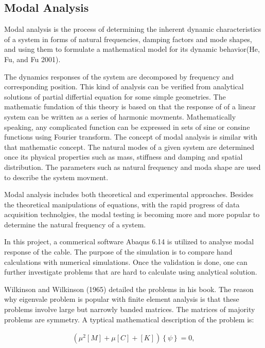 \documentclass[paper=a4, fontsize=11pt]{scrartcl} %
\numberwithin{equation}{section} %
\numberwithin{figure}{section} %
\numberwithin{table}{section} %
\begin{document}
\subsection{Modal Analysis}
\label{sec:modal-analysis}

Modal analysis is the process of determining the inherent dynamic
characteristics of a system in forms of natural frequencies, damping
factors and mode shapes, and using them to formulate a mathematical
model for its dynamic behavior(He, Fu, and Fu 2001).

The dynamics responses of the system are decomposed by frequency and
corresponding position. This kind of analysis can be verified from
analytical solutions of partial differtial equation for some simple
geometries. The mathematic fundation of this theory is based on that
the response of of a linear system can be written as a series of
harmonic movments. Mathematically speaking, any complicated function
can be expressed in sets of sine or consine functions using Fourier
transform. The concept of modal analysis is similar with that
mathematic concept. The natural modes of a given system are determined
once its physical properties such as mass, stiffness and damping and
spatial distribution. The parameters such as natural frequency and
moda shape are used to describe the system movment.

Modal analysis includes both theoretical and experimental approaches.
Besides the theoretical manipulations of equations, with the rapid
progress of data acquisition technolgies, the modal testing is becoming
more and more popular to determine the natural frequency of a system.

In this project, a commerical software Abaqus 6.14 is utilized to
analyse modal response of the cable. The purpose of the simulation is
to compare hand calculations with numerical simulations. Once the
validation is done, one can further investigate problems that are hard
to calculate using analytical solution.

Wilkinson and Wilkinson (1965) detailed the problems in his book. The
reason why eigenvale problem is popular with finite element analysis
is that these problems involve large but narrowly banded matrices. The
matrices of majority problems are symmetry. A typtical mathematical
description of the problem is:

\begin{align}
\left(\mu^2\left[M\right]+\mu\left[C\right]+\left[K\right]\right)\left\{\psi\right\}=0,
\end{align}
\end{document}
